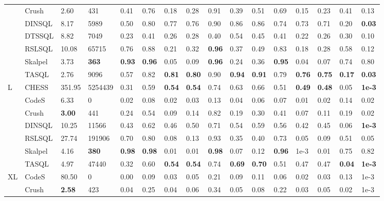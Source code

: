 \begin{table}
\begin{tabular}{llllllllllllllll}
 & Crush & 2.60 & 431 & 0.41 & 0.76 & 0.18 & 0.28 & 0.91 & 0.39 & 0.51 & 0.69 & 0.15 & 0.23 & 0.41 & 0.13 \\
 & DINSQL & 8.17 & 5989 & 0.50 & 0.80 & 0.77 & 0.76 & 0.90 & 0.86 & 0.86 & 0.74 & 0.73 & 0.71 & 0.20 & \textbf{0.03} \\
 & DTSSQL & 8.82 & 7049 & 0.23 & 0.41 & 0.26 & 0.28 & 0.40 & 0.54 & 0.45 & 0.41 & 0.22 & 0.26 & 0.30 & 0.10 \\
 & RSLSQL & 10.08 & 65715 & 0.76 & 0.88 & 0.21 & 0.32 & \textbf{0.96} & 0.37 & 0.49 & 0.83 & 0.18 & 0.28 & 0.58 & 0.12 \\
 & Skalpel & 3.73 & \textbf{363} & \textbf{0.93} & \textbf{0.96} & 0.05 & 0.09 & \textbf{0.96} & 0.24 & 0.36 & \textbf{0.95} & 0.04 & 0.07 & 0.74 & 0.80 \\
 & TASQL & 2.76 & 9096 & 0.57 & 0.82 & \textbf{0.81} & \textbf{0.80} & 0.90 & \textbf{0.94} & \textbf{0.91} & 0.79 & \textbf{0.76} & \textbf{0.75} & \textbf{0.17} & \textbf{0.03} \\
\cline{1-16}
\multirow[t]{7}{*}{L} & CHESS & 351.95 & 5254439 & 0.31 & 0.59 & \textbf{0.54} & \textbf{0.54} & 0.74 & 0.63 & 0.66 & 0.51 & \textbf{0.49} & \textbf{0.48} & 0.05 & \textbf{1e-3} \\
 & CodeS & 6.33 & 0 & 0.02 & 0.08 & 0.02 & 0.03 & 0.13 & 0.04 & 0.06 & 0.07 & 0.01 & 0.02 & 0.14 & 0.02 \\
 & Crush & \textbf{3.00} & 441 & 0.24 & 0.54 & 0.09 & 0.14 & 0.82 & 0.19 & 0.30 & 0.41 & 0.07 & 0.11 & 0.19 & 0.02 \\
 & DINSQL & 10.25 & 11566 & 0.43 & 0.62 & 0.46 & 0.50 & 0.71 & 0.54 & 0.59 & 0.56 & 0.42 & 0.45 & 0.06 & \textbf{1e-3} \\
 & RSLSQL & 27.74 & 191906 & 0.70 & 0.80 & 0.08 & 0.13 & 0.93 & 0.35 & 0.40 & 0.73 & 0.05 & 0.09 & 0.51 & 0.05 \\
 & Skalpel & 4.16 & \textbf{380} & \textbf{0.98} & \textbf{0.98} & 0.01 & 0.01 & \textbf{0.98} & 0.07 & 0.12 & \textbf{0.96} & 1e-3 & 0.01 & 0.75 & 0.82 \\
 & TASQL & 4.97 & 47440 & 0.32 & 0.60 & \textbf{0.54} & \textbf{0.54} & 0.74 & \textbf{0.69} & \textbf{0.70} & 0.51 & 0.47 & 0.47 & \textbf{0.04} & \textbf{1e-3} \\
\cline{1-16}
\multirow[t]{6}{*}{XL} & CodeS & 80.50 & 0 & 0.00 & 0.09 & 0.03 & 0.05 & 0.21 & 0.09 & 0.11 & 0.06 & 0.02 & 0.03 & 0.13 & 1e-3 \\
 & Crush & \textbf{2.58} & 423 & 0.04 & 0.25 & 0.04 & 0.06 & 0.34 & 0.05 & 0.08 & 0.22 & 0.03 & 0.05 & 0.02 & 1e-3 \\

\end{tabular}
\end{table}
